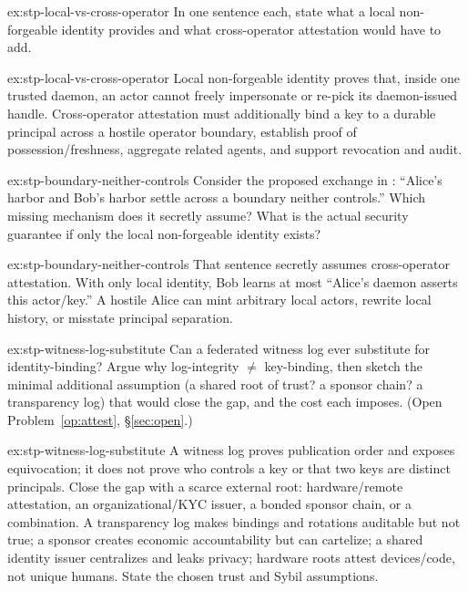 \documentclass[11pt,a4paper]{article}
\theoremstyle{definition}
\begin{document}

\begin{pdexercise}[kind=Check,rating=1]{ex:stp-local-vs-cross-operator}
In one sentence each, state what a local non-forgeable identity provides and
what cross-operator attestation would have to add.
\end{pdexercise}
\begin{pdsolution}{ex:stp-local-vs-cross-operator}
Local non-forgeable identity proves that, inside one trusted daemon, an actor
cannot freely impersonate or re-pick its daemon-issued handle. Cross-operator
attestation must additionally bind a key to a durable principal across a
hostile operator boundary, establish proof of possession/freshness, aggregate
related agents, and support revocation and audit.
\end{pdsolution}
\begin{pdexercise}[kind=Trace,rating=2]{ex:stp-boundary-neither-controls}
Consider the proposed exchange in :
``Alice's harbor and Bob's harbor settle across a boundary neither controls.'' Which missing
mechanism does it secretly assume? What is the actual security guarantee if only the local
non-forgeable identity exists?
\end{pdexercise}
\begin{pdsolution}{ex:stp-boundary-neither-controls}
That sentence secretly assumes cross-operator attestation. With only local
identity, Bob learns at most ``Alice's daemon asserts this actor/key.'' A
hostile Alice can mint arbitrary local actors, rewrite local history, or
misstate principal separation.
\end{pdsolution}
\begin{pdexercise}[kind=Open,rating=3]{ex:stp-witness-log-substitute}
Can a federated witness log ever substitute for identity-binding? Argue why
log-integrity $\ne$ key-binding, then sketch the minimal additional assumption
(a shared root of trust? a sponsor chain? a transparency log) that would
close the gap, and the cost each imposes. (Open Problem~\ref{op:attest},
\S\ref{sec:open}.)
\end{pdexercise}
\begin{pdsolution}{ex:stp-witness-log-substitute}
A witness log proves publication order and exposes equivocation; it does not
prove who controls a key or that two keys are distinct principals. Close the
gap with a scarce external root: hardware/remote attestation, an
organizational/KYC issuer, a bonded sponsor chain, or a combination. A
transparency log makes bindings and rotations auditable but not true; a
sponsor creates economic accountability but can cartelize; a shared identity
issuer centralizes and leaks privacy; hardware roots attest devices/code, not
unique humans. State the chosen trust and Sybil assumptions.
\end{pdsolution}
\end{document}
